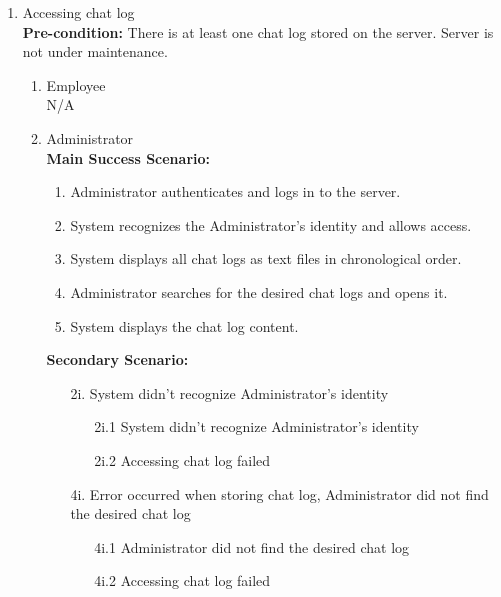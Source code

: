 \documentclass[]{article}
\begin{document}
\begin{enumerate}[{\bf BE1.}]
\begin{enumerate}[{\bf BE8.}]
	\item Accessing chat log \\
        \textbf{Pre-condition:} There is at least one chat log stored on the server. Server is not under maintenance. 
		\begin{enumerate}[{\bf VP1.}]
			\item Employee \\
   				N/A
		  \item Administrator \\
		\textbf{Main Success Scenario:}
                \begin{enumerate}[{  1.}]
                    \item Administrator authenticates and logs in to the server. 
		    \item System recognizes the Administrator’s identity and allows access.  
                    \item System displays all chat logs as text files in chronological order. 
                    \item Administrator searches for the desired chat logs and opens it. 
                    \item System displays the chat log content.  
                \end{enumerate}
                \textbf{Secondary Scenario:}
                \begin{enumerate}
		    \item[2i.] System didn’t recognize Administrator’s identity
                    \begin{enumerate}
                        \item[2i.1] System didn’t recognize Administrator’s identity
                        \item[2i.2] Accessing chat log failed
                    \end{enumerate}
                    \item[4i.]  Error occurred when storing chat log, Administrator did not find the desired chat log
                    \begin{enumerate}
                        \item[4i.1] Administrator did not find the desired chat log
                        \item[4i.2] Accessing chat log failed
                    \end{enumerate}
                \end{enumerate}

\end{enumerate}
\end{enumerate}
\end{enumerate}
\end{document}
